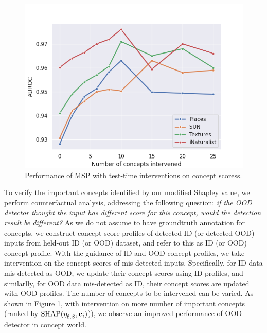 %
\begin{figure}
\centering
\includegraphics[scale=0.4]{figures/intervention_msp.png}
\caption{Performance of MSP with test-time interventions on concept scoress.}
\label{fig:intervention_msp}
\end{figure}
To verify the important concepts identified by our modified Shapley value, we perform counterfactual analysis, addressing the following question: \textit{if the OOD detector thought the input has different score for this concept, would the detection result be different?}
As we do not assume to have groundtruth annotation for concepts, we construct concept score profiles of detected-ID (or detected-OOD) inputs from held-out ID (or OOD) dataset, and refer to this as ID (or OOD) concept profile.
With the guidance of ID and OOD concept profiles, we take intervention on the concept scores of mis-detected inputs.
Specifically, for ID data mis-detected as OOD, we update their concept scores using ID profiles, and similarlly, for OOD data mis-detected as ID, their concept scores are updated with OOD profiles.
The number of concepts to be intervened can be varied.
As shown in Figure \ref{fig:intervention_msp}, with intervention on more number of important concepts (ranked by $\textrm{SHAP}(\eta^{}_{\mathbf{f}, S}, \mathbf{c}_i)$)), we observe an improved performance of OOD detector in concept world.
\fi